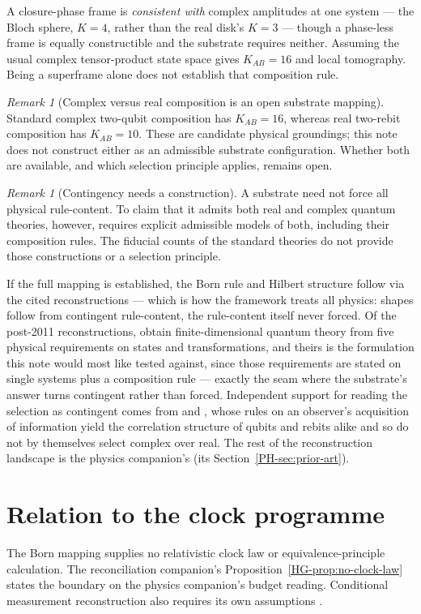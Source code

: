 \documentclass[11pt,a4paper]{article}
\theoremstyle{remark}\newtheorem{remark}[definition]{Remark}
\begin{document}
A closure-phase frame is \emph{consistent with} complex amplitudes at one system
--- the Bloch sphere, $K=4$, rather than the real disk's $K=3$ --- though a
phase-less frame is equally constructible and the substrate requires neither.
Assuming the usual complex tensor-product state space gives $K_{AB}=16$ and local tomography. Being a superframe alone does not establish that composition rule.

\begin{remark}[Complex versus real composition is an open substrate mapping]\label{prop:contingent}
Standard complex two-qubit composition has $K_{AB}=16$, whereas real
 two-rebit composition has $K_{AB}=10$. These are candidate physical
groundings; this note does not construct either as an admissible substrate
configuration. Whether both are available, and which selection principle
applies, remains open.
\end{remark}

\begin{remark}[Contingency needs a construction]\label{rem:misframing}
A substrate need not force all physical rule-content. To claim that it admits
both real and complex quantum theories, however, requires explicit admissible
models of both, including their composition rules. The fiducial counts of the
standard theories do not provide those constructions or a selection principle.
\end{remark}

If the full mapping is established, the Born rule and Hilbert structure follow via
the cited reconstructions --- which is how the framework treats
all physics: shapes follow from contingent rule-content, the rule-content itself
never forced. Of the post-2011 reconstructions, \citet{masanes2011} obtain
finite-dimensional quantum theory from five physical requirements on states and
transformations, and theirs is the formulation this note would most like tested
against, since those requirements are stated on single systems plus a composition
rule --- exactly the seam where the substrate's answer turns contingent rather than
forced. Independent support for reading the selection as contingent comes from
\citet{hoehn2017} and \citet{hoehnwever2017}, whose rules on an observer's
acquisition of information yield the correlation structure of qubits and rebits
alike and so do not by themselves select complex over real. The rest of the
reconstruction landscape is the physics companion's
(its Section~\ref{PH-sec:prior-art}).

\section{Relation to the clock programme}\label{sec:reconcile}
The Born mapping supplies no relativistic clock law or equivalence-principle
calculation. The reconciliation companion's
Proposition~\ref{HG-prop:no-clock-law} states the boundary on the physics
companion's budget reading. Conditional measurement reconstruction also
requires its own assumptions \citep{masanes2019,schlosshauerfine2005}.
\end{document}
